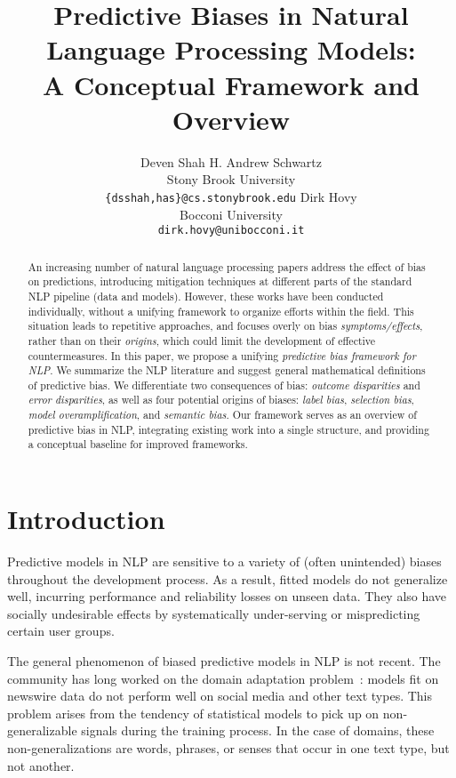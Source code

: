 \documentclass[11pt,a4paper]{article}
\title{Predictive Biases in Natural Language Processing Models:\\ A Conceptual Framework and Overview}
\author{Deven Shah \hspace{3em} H. Andrew Schwartz\\ 
        Stony Brook University\hspace{2em} \\
        \texttt{\{dsshah,has\}@cs.stonybrook.edu}\hspace{2em}
        \And
        Dirk Hovy\\
        Bocconi University\\
        \texttt{dirk.hovy@unibocconi.it}
        }
\date{}
\begin{document}
\maketitle

\begin{abstract}
An increasing number of natural language processing papers address the effect of bias on predictions, introducing mitigation techniques at different parts of the standard NLP pipeline (data and models).
However, these works have been conducted individually, without a unifying framework to organize efforts within the field. 
This situation leads to repetitive approaches, and focuses overly on bias \textit{symptoms/effects}, rather than on their \textit{origins}, which could limit the development of effective countermeasures.
In this paper, we propose a unifying \textit{predictive bias framework for NLP}. 
We summarize the NLP literature and suggest general mathematical definitions of predictive bias. We differentiate two consequences of bias: \textit{outcome disparities} and \textit{error disparities}, as well as four potential origins of biases: \textit{label bias}, \textit{selection bias}, \textit{model overamplification}, and \textit{semantic bias}.
Our framework serves as an overview of predictive bias in NLP, integrating existing work into a single structure, and providing a conceptual baseline for improved frameworks. 
\end{abstract}

\section{Introduction}

Predictive models in NLP are sensitive to a variety of (often unintended) biases throughout the development process. As a result, fitted models do not generalize well, incurring performance and reliability losses on unseen data. They also have socially undesirable effects by systematically under-serving or mispredicting certain user groups. 

The general phenomenon of biased predictive models in NLP is not recent. The community has long worked on the domain adaptation problem~\cite{jiang2007instance,daume2007frustratingly}: models fit on newswire data do not perform well on social media and other text types. This problem arises from the tendency of statistical models to pick up on non-generalizable signals during the training process. 
In the case of domains, these non-generalizations are words, phrases, or senses that occur in one text type, but not another.
\end{document}
